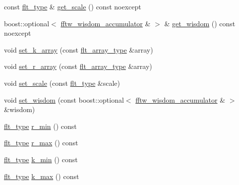 \begin{DoxyCompactItemize}
const \hyperlink{lib_2IceBRG__main_2common_8h_ad0f130a56eeb944d9ef2692ee881ecc4}{flt\+\_\+type} \& \hyperlink{classIceBRG_1_1Fourier_1_1radial__vector_ab7a62045cafb03671283f76367c47cf8}{get\+\_\+scale} () const  noexcept
\item 
boost\+::optional$<$ \hyperlink{classIceBRG_1_1Fourier_1_1fftw__wisdom__accumulator}{fftw\+\_\+wisdom\+\_\+accumulator} \& $>$ \& \hyperlink{classIceBRG_1_1Fourier_1_1radial__vector_a5b7e8de69cfcda31cfb4ce046f30daf7}{get\+\_\+wisdom} () const  noexcept
\item 
void \hyperlink{classIceBRG_1_1Fourier_1_1radial__vector_abae33af5555fdc1cf5c32a96985caa25}{set\+\_\+k\+\_\+array} (const \hyperlink{namespaceIceBRG_acdca5c05302480eba6ba053449643a6d}{flt\+\_\+array\+\_\+type} \&array)
\item 
void \hyperlink{classIceBRG_1_1Fourier_1_1radial__vector_a36d6cf58120aaf2e4e795cb7664f7e06}{set\+\_\+r\+\_\+array} (const \hyperlink{namespaceIceBRG_acdca5c05302480eba6ba053449643a6d}{flt\+\_\+array\+\_\+type} \&array)
\item 
void \hyperlink{classIceBRG_1_1Fourier_1_1radial__vector_a60252cd582fe9f10ca2cc1749f6b6283}{set\+\_\+scale} (const \hyperlink{lib_2IceBRG__main_2common_8h_ad0f130a56eeb944d9ef2692ee881ecc4}{flt\+\_\+type} \&scale)
\item 
void \hyperlink{classIceBRG_1_1Fourier_1_1radial__vector_a64f6befadbdf161684eb35648c7eaa17}{set\+\_\+wisdom} (const boost\+::optional$<$ \hyperlink{classIceBRG_1_1Fourier_1_1fftw__wisdom__accumulator}{fftw\+\_\+wisdom\+\_\+accumulator} \& $>$ \&wisdom)
\item 
\hyperlink{lib_2IceBRG__main_2common_8h_ad0f130a56eeb944d9ef2692ee881ecc4}{flt\+\_\+type} \hyperlink{classIceBRG_1_1Fourier_1_1radial__vector_a33ae52f5a86f099cdc203a6d7d748279}{r\+\_\+min} () const 
\item 
\hyperlink{lib_2IceBRG__main_2common_8h_ad0f130a56eeb944d9ef2692ee881ecc4}{flt\+\_\+type} \hyperlink{classIceBRG_1_1Fourier_1_1radial__vector_ae03c379b205562781280e72c55bf78d7}{r\+\_\+max} () const 
\item 
\hyperlink{lib_2IceBRG__main_2common_8h_ad0f130a56eeb944d9ef2692ee881ecc4}{flt\+\_\+type} \hyperlink{classIceBRG_1_1Fourier_1_1radial__vector_a05d64c344c9c5feb85f7c2d692dc406a}{k\+\_\+min} () const 
\item 
\hyperlink{lib_2IceBRG__main_2common_8h_ad0f130a56eeb944d9ef2692ee881ecc4}{flt\+\_\+type} \hyperlink{classIceBRG_1_1Fourier_1_1radial__vector_a36a60bfadd705c83286018381a7236c5}{k\+\_\+max} () const 
\item 

\end{DoxyCompactItemize}

